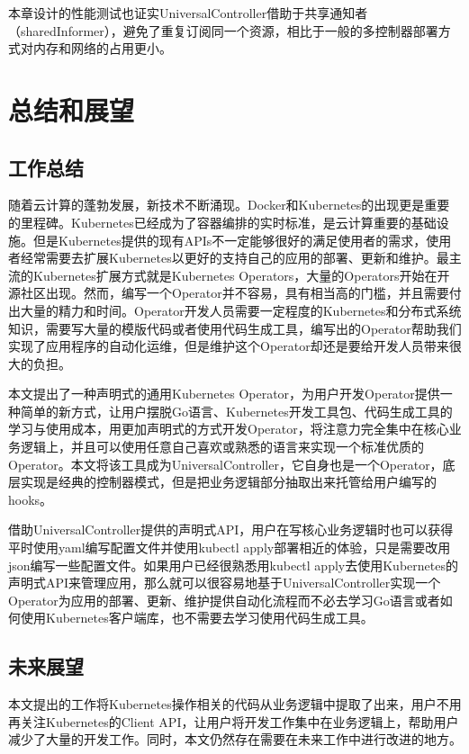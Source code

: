 \documentclass[macfonts,master]{njuthesis}
\begin{document}
本章设计的性能测试也证实UniversalController借助于共享通知者（sharedInformer），避免了重复订阅同一个资源，相比于一般的多控制器部署方式对内存和网络的占用更小。
\chapter{总结和展望}\label{chapter_concludes}
\section{工作总结}
随着云计算的蓬勃发展，新技术不断涌现。Docker和Kubernetes的出现更是重要的里程碑。Kubernetes已经成为了容器编排的实时标准，是云计算重要的基础设施。但是Kubernetes提供的现有APIs不一定能够很好的满足使用者的需求，使用者经常需要去扩展Kubernetes以更好的支持自己的应用的部署、更新和维护。最主流的Kubernetes扩展方式就是Kubernetes Operators，大量的Operators开始在开源社区出现。然而，编写一个Operator并不容易，具有相当高的门槛，并且需要付出大量的精力和时间。Operator开发人员需要一定程度的Kubernetes和分布式系统知识，需要写大量的模版代码或者使用代码生成工具，编写出的Operator帮助我们实现了应用程序的自动化运维，但是维护这个Operator却还是要给开发人员带来很大的负担。

本文提出了一种声明式的通用Kubernetes Operator，为用户开发Operator提供一种简单的新方式，让用户摆脱Go语言、Kubernetes开发工具包、代码生成工具的学习与使用成本，用更加声明式的方式开发Operator，将注意力完全集中在核心业务逻辑上，并且可以使用任意自己喜欢或熟悉的语言来实现一个标准优质的Operator。本文将该工具成为UniversalController，它自身也是一个Operator，底层实现是经典的控制器模式，但是把业务逻辑部分抽取出来托管给用户编写的hooks。

借助UniversalController提供的声明式API，用户在写核心业务逻辑时也可以获得平时使用yaml编写配置文件并使用kubectl apply部署相近的体验，只是需要改用json编写一些配置文件。如果用户已经很熟悉用kubectl apply去使用Kubernetes的声明式API来管理应用，那么就可以很容易地基于UniversalController实现一个Operator为应用的部署、更新、维护提供自动化流程而不必去学习Go语言或者如何使用Kubernetes客户端库，也不需要去学习使用代码生成工具。

\section{未来展望}
本文提出的工作将Kubernetes操作相关的代码从业务逻辑中提取了出来，用户不用再关注Kubernetes的Client API，让用户将开发工作集中在业务逻辑上，帮助用户减少了大量的开发工作。同时，本文仍然存在需要在未来工作中进行改进的地方。
\end{document}
